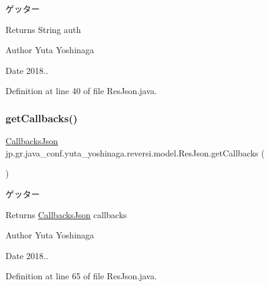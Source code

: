 ゲッター 

\begin{DoxyReturn}{Returns}
String auth 
\end{DoxyReturn}
\begin{DoxyAuthor}{Author}
Yuta Yoshinaga 
\end{DoxyAuthor}
\begin{DoxyDate}{Date}
2018.. 
\end{DoxyDate}


Definition at line 40 of file Res\+Json.\+java.

\mbox{\label{classjp_1_1gr_1_1java__conf_1_1yuta__yoshinaga_1_1reversi_1_1model_1_1_res_json_a1bd6cdcfb3ea59616409b5aae1d408e2}} 
\subsubsection{\texorpdfstring{get\+Callbacks()}{getCallbacks()}}
{\footnotesize\ttfamily \mbox{\hyperlink{classjp_1_1gr_1_1java__conf_1_1yuta__yoshinaga_1_1reversi_1_1model_1_1_callbacks_json}{Callbacks\+Json}} jp.\+gr.\+java\+\_\+conf.\+yuta\+\_\+yoshinaga.\+reversi.\+model.\+Res\+Json.\+get\+Callbacks (\begin{DoxyParamCaption}{ }\end{DoxyParamCaption})}



ゲッター 

\begin{DoxyReturn}{Returns}
\mbox{\hyperlink{classjp_1_1gr_1_1java__conf_1_1yuta__yoshinaga_1_1reversi_1_1model_1_1_callbacks_json}{Callbacks\+Json}} callbacks 
\end{DoxyReturn}
\begin{DoxyAuthor}{Author}
Yuta Yoshinaga 
\end{DoxyAuthor}
\begin{DoxyDate}{Date}
2018.. 
\end{DoxyDate}


Definition at line 65 of file Res\+Json.\+java.

